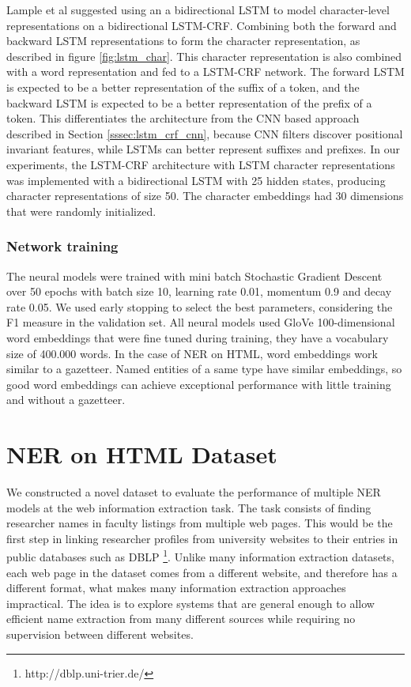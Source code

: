 \documentclass[sigconf]{acmart}
\begin{document}
Lample et al \cite{Lample2016} suggested using an a bidirectional LSTM to model character-level 
representations on a bidirectional LSTM-CRF. Combining both the forward and backward 
LSTM representations to form the character representation, as described in figure \ref{fig:lstm_char}. 
This character representation is also combined with a word representation and fed to a LSTM-CRF network. 
The forward LSTM is expected to be a better
representation of the suffix of a token, and the backward LSTM is expected to be a
better representation of the prefix of a token. This differentiates the architecture
from the CNN based approach described in Section \ref{sssec:lstm_crf_cnn}, because CNN filters 
discover positional invariant features, while LSTMs can better represent suffixes and prefixes. In our experiments, 
the LSTM-CRF architecture with LSTM character representations was implemented with a bidirectional LSTM
with 25 hidden states, producing character representations of size 50. The character embeddings
had 30 dimensions that were randomly initialized.

\subsubsection{Network training}

The neural models were trained with mini batch Stochastic Gradient Descent over 50 epochs with batch size 10,
learning rate 0.01, momentum 0.9 and decay rate 0.05. We used early stopping \cite{Caruana2000} to select the best 
parameters, considering the F1 measure in the validation set. All neural models used 
GloVe 100-dimensional word embeddings \cite{Pennington2014} that were fine tuned during training,
they have a vocabulary size of 400.000 words.
In the case of NER on HTML, word embeddings work similar to a gazetteer. Named entities 
of a same type have similar embeddings, so good word embeddings can achieve exceptional 
performance with little training and without a gazetteer. 

\section{NER on HTML Dataset}
\label{sec:ner_dataset}

We constructed a novel dataset to evaluate the performance of multiple NER models
at the web information extraction task. The task consists of finding researcher
names in faculty listings from multiple web pages. This would be the 
first step in linking researcher profiles from university websites to their entries
in public databases such as DBLP \footnote{http://dblp.uni-trier.de/}. Unlike many
information extraction datasets, each web page in the dataset comes from a different 
website, and therefore has a different format, what makes many information
extraction approaches impractical. The idea is to explore systems that are general 
enough to allow efficient name extraction from many different sources while requiring
no supervision between different websites. 
\end{document}
